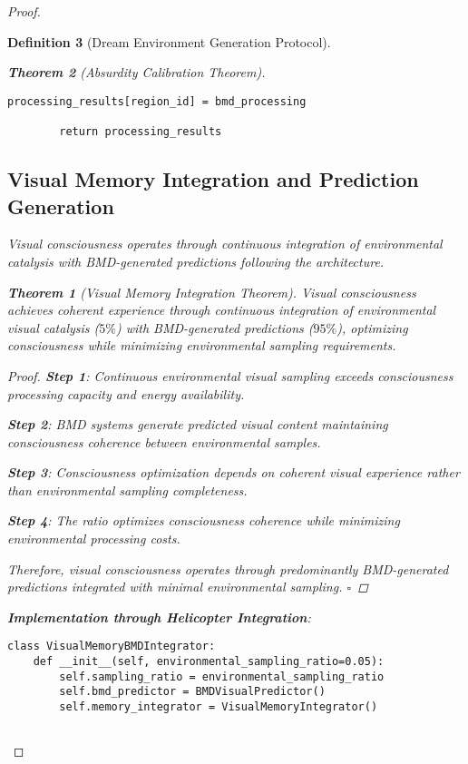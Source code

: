 \documentclass[12pt,a4paper]{article}
\newtheorem{theorem}{Theorem}[section]
\newtheorem{definition}[theorem]{Definition}
\begin{document}
\begin{proof}
\begin{definition}[Dream Environment Generation Protocol]
\begin{theorem}[Absurdity Calibration Theorem]
\begin{lstlisting}[style=pythonstyle, caption=Visual Attention BMD Resource Allocation]
            processing_results[region_id] = bmd_processing
        
        return processing_results
\end{lstlisting}

\subsection{Visual Memory Integration and Prediction Generation}

Visual consciousness operates through continuous integration of environmental catalysis with BMD-generated predictions following the  architecture.

\begin{theorem}[Visual Memory Integration Theorem]
Visual consciousness achieves coherent experience through continuous integration of environmental visual catalysis ($5\%$) with BMD-generated predictions ($95\%$), optimizing consciousness while minimizing environmental sampling requirements.
\end{theorem}

\begin{proof}
\textbf{Step 1}: Continuous environmental visual sampling exceeds consciousness processing capacity and energy availability.

\textbf{Step 2}: BMD systems generate predicted visual content maintaining consciousness coherence between environmental samples.

\textbf{Step 3}: Consciousness optimization depends on coherent visual experience rather than environmental sampling completeness.

\textbf{Step 4}: The  ratio optimizes consciousness coherence while minimizing environmental processing costs.

Therefore, visual consciousness operates through predominantly BMD-generated predictions integrated with minimal environmental sampling. $\square$
\end{proof}

\textbf{Implementation through Helicopter Integration}:

\begin{lstlisting}[style=pythonstyle, caption=Visual Memory BMD Integration]
class VisualMemoryBMDIntegrator:
    def __init__(self, environmental_sampling_ratio=0.05):
        self.sampling_ratio = environmental_sampling_ratio
        self.bmd_predictor = BMDVisualPredictor()
        self.memory_integrator = VisualMemoryIntegrator()
        

\end{lstlisting}
\end{theorem}
\end{definition}
\end{proof}
\end{document}
